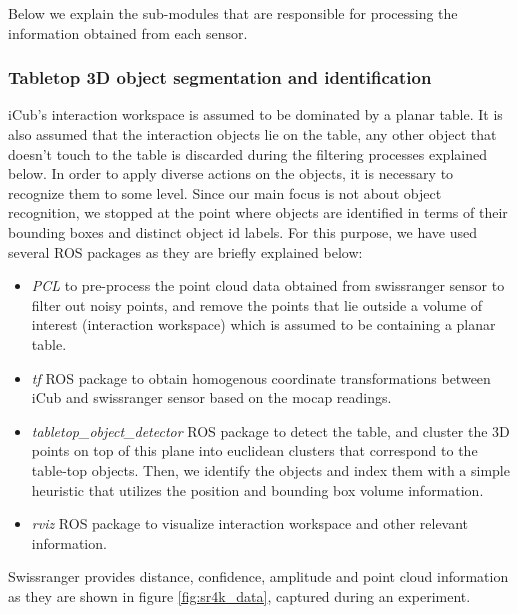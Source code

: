 \documentclass[runningheads,a4paper]{llncs}
\begin{document}
Below we explain the sub-modules that are responsible for processing the information obtained from each sensor.

\subsubsection{Tabletop 3D object segmentation and identification\newline\newline}

iCub's interaction workspace is assumed to be dominated by a planar table. It is also assumed that the interaction objects lie on the table, any other object that doesn't touch to the table is discarded during the filtering processes explained below. In order to apply diverse actions on the objects, it is necessary to recognize them to some level. Since our main focus is not about object recognition, we stopped at the point where objects are identified in terms of their bounding boxes and distinct object id labels. For this purpose, we have used several ROS packages as they are briefly explained below:

\begin{itemize}
 \item \emph{PCL}\cite{pcl} to pre-process the point cloud data obtained from swissranger sensor to filter out noisy points, and remove the points that lie outside a volume of interest (interaction workspace) which is assumed to be containing a planar table.
 \item \emph{tf} ROS package to obtain homogenous coordinate transformations between iCub and swissranger sensor based on the mocap readings.
 \item \emph{tabletop\_object\_detector} ROS package to detect the table, and cluster the 3D points on top of this plane into euclidean clusters that correspond to the table-top objects. Then, we identify the objects and index them with a simple heuristic that utilizes the position and bounding box volume information.
 \item \emph{rviz} ROS package to visualize interaction workspace and other relevant information.
\end{itemize}

Swissranger provides distance, confidence, amplitude and point cloud information as they are shown in figure \ref{fig:sr4k_data}, captured during an experiment.
\end{document}
